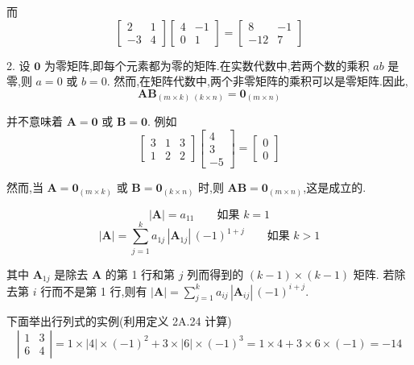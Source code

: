 而
\[
\begin{bmatrix} 2 & 1 \\ -3 & 4 \end{bmatrix}\begin{bmatrix} 4 & -1 \\ 0 & 1 \end{bmatrix} = \begin{bmatrix} 8 & -1 \\ -12 & 7 \end{bmatrix}
\]

2. 设 $\bm{0}$ 为零矩阵,即每个元素都为零的矩阵.在实数代数中,若两个数的乘积 $ab$ 是零,则 $a=0$ 或 $b=0$. 然而,在矩阵代数中,两个非零矩阵的乘积可以是零矩阵.因此,
\[
\bm{A}\bm{B}_{(m\times k)\;(k\times n)} = \bm{0}_{(m\times n)}
\]

并不意味着 $\bm{A}=\bm{0}$ 或 $\bm{B}=\bm{0}$. 例如
\[
\begin{bmatrix} 3 & 1 & 3 \\ 1 & 2 & 2 \end{bmatrix}\begin{bmatrix} 4 \\ 3 \\ -5 \end{bmatrix} = \begin{bmatrix} 0 \\ 0 \end{bmatrix}
\]

然而,当 $\bm{A} = \bm{0}_{(m\times k)}$ 或 $\bm{B} = \bm{0}_{(k\times n)}$ 时,则 $\bm{A}\bm{B} = \bm{0}_{(m\times n)}$,这是成立的.

\[
|\bm{A}| = a_{11} \qquad \text{如果 } k=1
\]
\[
|\bm{A}| = \sum_{j=1}^{k}a_{1j}\,|\bm{A}_{1j}|\,(-1)^{1+j} \qquad \text{如果 } k>1
\]

其中 $\bm{A}_{1j}$ 是除去 $\bm{A}$ 的第 1 行和第 $j$ 列而得到的 $(k-1)\times(k-1)$ 矩阵. 若除去第 $i$ 行而不是第 1 行,则有 $|\bm{A}| = \sum\limits_{j=1}^{k}a_{ij}\,|\bm{A}_{ij}|\,(-1)^{i+j}$.

下面举出行列式的实例(利用定义 2A.24 计算)
\[
\left|\begin{matrix} 1 & 3 \\ 6 & 4 \end{matrix}\right| = 1\times|4|\times(-1)^2 + 3\times|6|\times(-1)^3 = 1\times4 + 3\times6\times(-1) = -14
\]
